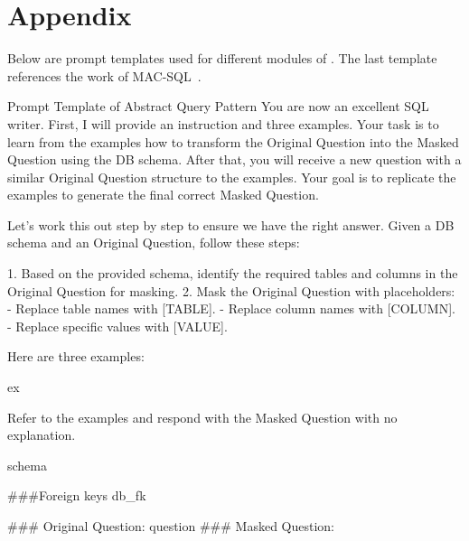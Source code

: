 \onecolumn

\section{Appendix}
\label{sec:appendix}

Below are prompt templates used for different modules of \model. The last template references the work of MAC-SQL~\citep{wang2024mac}.

\begin{myverbatim}{Prompt Template of Abstract Query Pattern}
You are now an excellent SQL writer. First, I will provide an instruction and three examples. Your task is to learn from the examples how to transform the Original Question into the Masked Question using the DB schema. After that, you will receive a new question with a similar Original Question structure to the examples. Your goal is to replicate the examples to generate the final correct Masked Question.

Let's work this out step by step to ensure we have the right answer. Given a DB schema and an Original Question, follow these steps:

1. Based on the provided schema, identify the required tables and columns in the Original Question for masking.
2. Mask the Original Question with placeholders:
    - Replace table names with [TABLE].
    - Replace column names with [COLUMN].
    - Replace specific values with [VALUE].

Here are three examples:

{ex}

Refer to the examples and respond with the Masked Question with no explanation.

{schema}

###Foreign keys
{db_fk}

### Original Question: {question}
### Masked Question:
\end{myverbatim}

